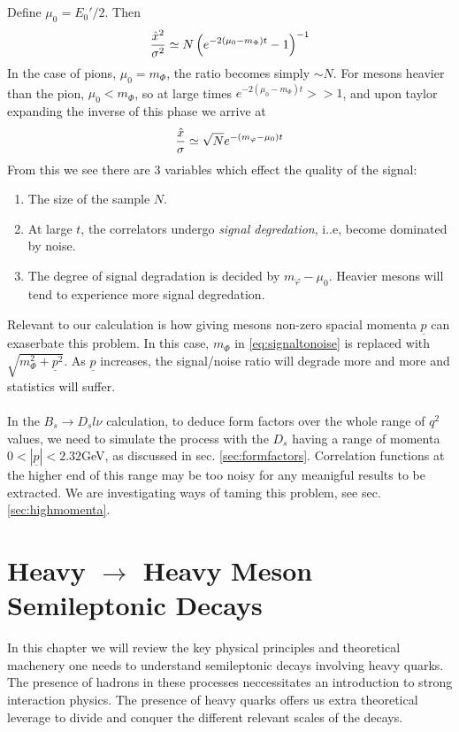 \\ \\
Define $\mu_0 = E_0'/2$. Then
\begin{align}
	{\hat{x}^2\over \sigma^2} \simeq N \left( e^{-2(\mu_0 - m_{\Phi})t} - 1 \right) ^{-1}
\end{align}
In the case of pions, $\mu_0 = m_{\Phi}$, the ratio becomes simply $\sim N$. For mesons heavier than the pion, $\mu_0 < m_{\Phi}$, so at large times $e^{-2(\mu_0 - m_{\Phi})t} >> 1$, and upon taylor expanding the inverse of this phase we arrive at
\begin{align}
	{\hat{x}\over\sigma} \simeq \sqrt{N} e^{-(m_{\varphi} - \mu_0)t}
	\label{eq:signaltonoise}
\end{align}
From this we see there are 3 variables which effect the quality of the signal:
\begin{enumerate}
\item
The size of the sample $N$.
\item
At large $t$, the correlators undergo {\it{signal degredation}}, i..e, become dominated by noise.
\item
The degree of signal degradation is decided by $m_{\varphi} - \mu_0$. Heavier mesons will tend to experience more signal degredation.
\end{enumerate}
Relevant to our calculation is how giving mesons non-zero spacial momenta $\underline{p}$ can exaserbate this problem. In this case, $m_{\Phi}$ in \eqref{eq:signaltonoise} is replaced with $\sqrt{m_{\Phi}^2+\underline{p}^2}$. As $\underline{p}$ increases, the signal/noise ratio will degrade more and more and statistics will suffer.
\\ \\
In the $B_s\to D_s l\nu$ calculation, to deduce form factors over the whole range of $q^2$ values, we need to simulate the process with the $D_s$ having a range of momenta $0 < |\underline{p}| < 2.32$GeV, as discussed in sec. \ref{sec:formfactors}. Correlation functions at the higher end of this range may be too noisy for any meanigful results to be extracted. We are investigating ways of taming this problem, see sec. \ref{sec:highmomenta}.\chapter{Heavy $\to$ Heavy Meson Semileptonic Decays}
\label{chap:semileptonic}

In this chapter we will review the key physical principles and theoretical machenery one needs to understand semileptonic decays involving heavy quarks. The presence of hadrons in these processes neccessitates an introduction to strong interaction physics. The presence of heavy quarks offers us extra theoretical leverage to divide and conquer the different relevant scales of the decays.

